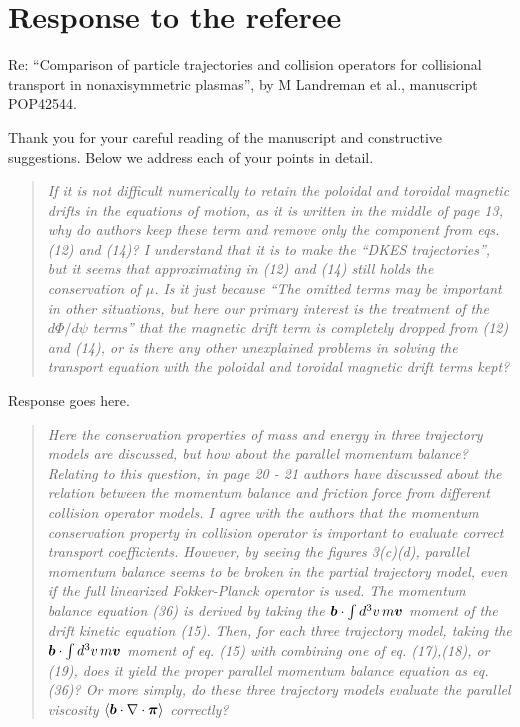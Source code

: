 \documentclass[11pt]{article}
\newcommand{\vect}[1]{\mbox{\boldmath $#1$}}
\newenvironment{referee}{\begin{quote}\it\color{Blue}}{\end{quote}}
\begin{document}
  
\section*{Response to the referee}

Re: ``Comparison of particle trajectories and collision operators for
collisional transport in nonaxisymmetric plasmas'', by
M Landreman et al., manuscript POP42544.\newline


Thank you for your careful reading of the manuscript and constructive suggestions.
Below we address each of your points in detail.

\begin{referee}
If it is not difficult numerically to retain the poloidal and toroidal magnetic drifts in the
equations of motion, as it is written in the middle of page 13, why do authors keep these term
and remove only the component from eqs.(12) and (14)? I understand that it is to make
the ``DKES trajectories'', but it seems that approximating in (12) and (14) still
holds the conservation of $\mu$. Is it just because ``The omitted terms may be important in other
situations, but here our primary interest is the treatment of the $d\Phi/d\psi$ terms'' that the magnetic
drift term is completely dropped from (12) and (14), or is there any other unexplained problems
in solving the transport equation with the poloidal and toroidal magnetic drift terms kept?
\end{referee}

Response goes here.

\begin{referee}
Here the conservation properties of mass and energy in three trajectory models are discussed,
but how about the parallel momentum balance? Relating to this question, in page 20 - 21
authors have discussed about the relation between the momentum balance and friction force
from different collision operator models. I agree with the authors that the momentum
conservation property in collision operator is important to evaluate correct transport coefficients.
However, by seeing the figures 3(c)(d), parallel momentum balance seems to be broken in the
partial trajectory model, even if the full linearized Fokker-Planck operator is used.
The momentum balance equation (36) is derived by taking the $\vect{b}\cdot \int d^3v\, m\vect{v}$ moment of the drift
kinetic equation (15). Then, for each three trajectory model, taking the $\vect{b}\cdot \int d^3v\, m\vect{v}$ moment of
eq. (15) with combining one of eq. (17),(18), or (19), does it yield the proper parallel momentum
balance equation as eq.(36)? Or more simply, do these three trajectory models evaluate the
parallel viscosity $\left<\vect{b}\cdot\nabla\cdot\vect{\pi}\right>$ correctly?
\end{referee}
\end{document}
